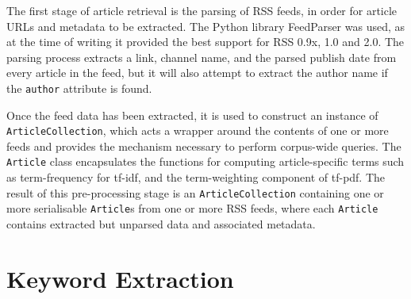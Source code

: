 The first stage of article retrieval is the parsing of RSS feeds, in order for article URLs and metadata to be extracted. The Python library FeedParser was used, as at the time of writing it provided the best support for RSS 0.9x, 1.0 and 2.0. The parsing process extracts a link, channel name, and the parsed publish date from every article in the feed, but it will also attempt to extract the author name if the \texttt{author} attribute is found.

Once the feed data has been extracted, it is used to construct an instance of \texttt{ArticleCollection}, which acts a wrapper around the contents of one or more feeds and provides the mechanism necessary to perform corpus-wide queries. The \texttt{Article} class encapsulates the functions for computing article-specific terms such as term-frequency for tf-idf, and the term-weighting component of tf-pdf. The result of this pre-processing stage is an \texttt{ArticleCollection} containing one or more serialisable \texttt{Article}s from one or more RSS feeds, where each \texttt{Article} contains extracted but unparsed data and associated metadata.

\section{Keyword Extraction} \label{sec:keys}

